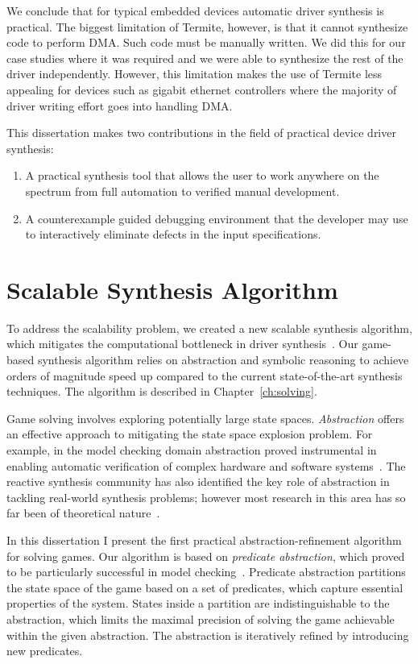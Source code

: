 We conclude that for typical embedded devices automatic driver synthesis is practical. The biggest limitation of Termite, however, is that it cannot synthesize code to perform DMA. Such code must be manually written. We did this for our case studies where it was required and we were able to synthesize the rest of the driver independently. However, this limitation makes the use of Termite less appealing for devices such as gigabit ethernet controllers where the majority of driver writing effort goes into handling DMA.

This dissertation makes two contributions in the field of practical device driver synthesis:
\begin{enumerate}
    \item A practical synthesis tool that allows the user to work anywhere on the spectrum from full automation to verified manual development.
    \item A counterexample guided debugging environment that the developer may use to interactively eliminate defects in the input specifications.
\end{enumerate}

\section{Scalable Synthesis Algorithm}
\label{sec:scalable_synth}

To address the scalability problem, we created a new scalable synthesis algorithm, which mitigates the computational bottleneck in driver synthesis~\cite{Walker_Ryzhyk_14}. Our game-based synthesis algorithm relies on abstraction and symbolic reasoning to achieve orders of magnitude speed up compared to the current state-of-the-art synthesis techniques.  The algorithm is described in Chapter~\ref{ch:solving}.

Game solving involves exploring potentially large state spaces. \emph{Abstraction} offers an effective approach to mitigating the state space explosion problem.  For example, in the model checking domain abstraction proved instrumental in enabling automatic verification of complex hardware and software systems~\cite{Clarke_GJLV_00,Clarke_KSY_04,Henzinger_JMS_02}.  The reactive synthesis community has also identified the key role of abstraction in tackling real-world synthesis problems; however most research in this area has so far been of theoretical nature~\cite{Alfaro_Roy_07,Henzinger_JM_03}.  

In this dissertation I present the first practical abstraction-refinement algorithm for solving games.  Our algorithm is based on \emph{predicate abstraction}, which proved to be particularly successful in model checking~\cite{Graf_Saidi_97}.  Predicate abstraction partitions the state space of the game based on a set of predicates, which capture essential properties of the system.  States inside a partition are indistinguishable to the abstraction, which limits the maximal precision of solving the game achievable within the given abstraction.  The abstraction is iteratively refined by introducing new predicates.

